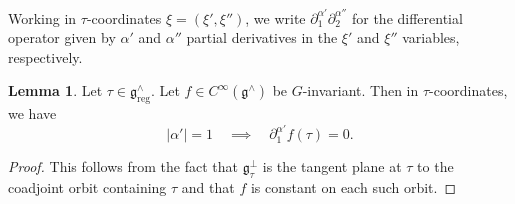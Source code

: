 \documentclass[reqno]{amsart}
\DeclareMathOperator{\reg}{reg}
\theoremstyle{plain} \newtheorem{theorem} {Theorem}
\theoremstyle{definition} \newtheorem{definition} [theorem] {Definition}
\theoremstyle{itplain} %
\newtheorem{lemma}[theorem]{Lemma}
\numberwithin{equation}{section}
\numberwithin{theorem}{section}
\begin{document}
Working in $\tau$-coordinates $\xi = (\xi ', \xi '')$, we write $\partial_1^{\alpha '} \partial_2^{\alpha ''}$ for the differential operator given by $\alpha '$ and $\alpha ''$ partial derivatives in the $\xi'$ and $\xi ''$ variables, respectively.
\begin{lemma}\label{lem:derivatives-along-orbits-inv-fn}
  Let $\tau \in \mathfrak{g}^\wedge_{\reg}$.  Let $f \in C^\infty(\mathfrak{g}^\wedge)$ be $G$-invariant.  Then in $\tau$-coordinates, we have
  \[
    |\alpha '| =1 \quad \implies \quad \partial_{1}^{\alpha '} f(\tau) = 0.
  \]
\end{lemma}
\begin{proof}
  This follows from the fact that $\mathfrak{g}_\tau^\perp$ is the tangent plane at $\tau$ to the coadjoint orbit containing $\tau$ and that $f$ is constant on each such orbit.
\end{proof}
\end{document}
